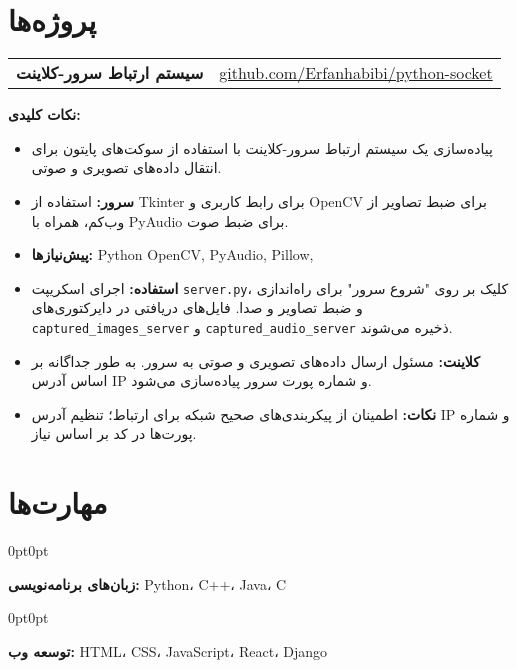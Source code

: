\documentclass[10pt, a4paper]{article}
\newenvironment{onecolentry}{
    \begin{adjustwidth}{0pt}{0pt}
}{\end{adjustwidth}}
\begin{document}
\section{پروژه‌ها}

\begin{tabularx}{\textwidth}{Xl} %
    \textbf{سیستم ارتباط سرور-کلاینت} & \href{https://github.com/Erfanhabibi/python-socket.git}{github.com/Erfanhabibi/python-socket} \\ 
\end{tabularx}

\vspace{0.1 cm}

\textbf{نکات کلیدی:}
\begin{itemize}
    \item پیاده‌سازی یک سیستم ارتباط سرور-کلاینت با استفاده از سوکت‌های پایتون برای انتقال داده‌های تصویری و صوتی.
    \item \textbf{سرور:} استفاده از Tkinter برای رابط کاربری و OpenCV برای ضبط تصاویر از وب‌کم، همراه با PyAudio برای ضبط صوت.
    \item \textbf{پیش‌نیازها:} Python OpenCV, PyAudio, Pillow,
    \item \textbf{استفاده:} اجرای اسکریپت \texttt{server.py}، کلیک بر روی "شروع سرور" برای راه‌اندازی و ضبط تصاویر و صدا. فایل‌های دریافتی در دایرکتوری‌های \texttt{captured\_images\_server} و \texttt{captured\_audio\_server} ذخیره می‌شوند.
    \item \textbf{کلاینت:} مسئول ارسال داده‌های تصویری و صوتی به سرور. به طور جداگانه بر اساس آدرس IP و شماره پورت سرور پیاده‌سازی می‌شود.
    \item \textbf{نکات:} اطمینان از پیکربندی‌های صحیح شبکه برای ارتباط؛ تنظیم آدرس IP و شماره پورت‌ها در کد بر اساس نیاز.
\end{itemize}

\section{مهارت‌ها}

\begin{onecolentry}
    \textbf{زبان‌های برنامه‌نویسی:} Python، C++، Java، C
\end{onecolentry}

\vspace{0.1 cm}

\begin{onecolentry}
    \textbf{توسعه وب:} HTML، CSS، JavaScript، React، Django
\end{onecolentry}
\end{document}
